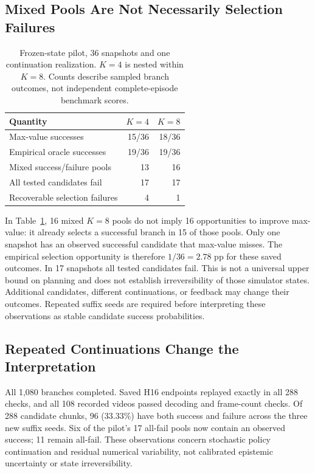 \documentclass{article}
\begin{document}
\subsection{Mixed Pools Are Not Necessarily Selection Failures}
\begin{table}[t]
 \centering
 \caption{Frozen-state pilot, 36 snapshots and one continuation realization.
 $K=4$ is nested within $K=8$. Counts describe sampled branch outcomes, not
 independent complete-episode benchmark scores.}
 \label{tab:pilot}
 \begin{tabular}{lrr}
  \toprule
  Quantity & $K=4$ & $K=8$ \\
  \midrule
  Max-value successes & 15/36 & 18/36 \\
  Empirical oracle successes & 19/36 & 19/36 \\
  Mixed success/failure pools & 13 & 16 \\
  All tested candidates fail & 17 & 17 \\
  Recoverable selection failures & 4 & 1 \\
  \bottomrule
 \end{tabular}
\end{table}

In Table~\ref{tab:pilot}, 16 mixed $K=8$ pools do not imply 16 opportunities
to improve max-value: it already selects a successful branch in 15 of those
pools. Only one snapshot has an observed successful candidate that max-value
misses. The empirical selection opportunity is therefore $1/36=2.78$ pp for
these saved outcomes. In 17 snapshots all tested candidates fail.
This is not a universal upper bound on planning and does not establish
irreversibility of those simulator states. Additional candidates, different
continuations, or feedback may change their outcomes. Repeated suffix seeds
are required before interpreting these observations as stable candidate
success probabilities.

\subsection{Repeated Continuations Change the Interpretation}
All 1,080 branches completed. Saved H16 endpoints replayed exactly in all
288 checks, and all 108 recorded videos passed decoding and frame-count
checks. Of 288 candidate chunks, 96 (33.33\%) have both success and failure
across the three new suffix seeds. Six of the pilot's 17 all-fail pools now
contain an observed success; 11 remain all-fail. These observations concern
stochastic policy continuation and residual numerical variability, not
calibrated epistemic uncertainty or state irreversibility.
\end{document}
